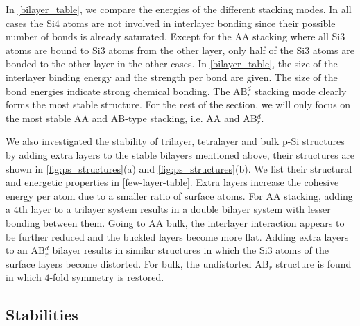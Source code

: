 In \autoref{bilayer_table}, we compare the energies of the different stacking modes. In all cases the Si4 atoms are not involved in interlayer bonding since their possible number of bonds is already saturated.  Except for the AA stacking where all Si3 atoms are bound to Si3 atoms from the other layer, only half of the Si3 atoms are bonded to the other layer in the other cases. In \autoref{bilayer_table}, the size of the interlayer binding energy and the strength per bond are given. The size of the bond energies indicate strong chemical bonding. The  AB$_r^d$ stacking mode clearly forms the most stable structure. For the rest of the section, we will only focus on the most stable AA and AB-type stacking, i.e. AA and AB$_r^d$.

We also investigated the stability of trilayer, tetralayer and bulk p-Si structures by adding extra layers to the stable bilayers mentioned above, their structures are shown in \autoref{fig:ps_structures}(a) and \autoref{fig:ps_structures}(b). We list their structural and energetic properties in \autoref{few-layer-table}. Extra layers increase the cohesive energy per atom due to a smaller ratio of surface atoms. For AA stacking, adding a 4th layer to a trilayer system results in a double bilayer system with lesser bonding between them. Going to AA bulk, the interlayer interaction appears to be further reduced and the buckled layers become more flat. Adding extra layers to an AB$_r^d$ bilayer results in similar structures in which the Si3 atoms of the surface layers become distorted. For bulk, the undistorted AB$_r$ structure is found in which $\overline{4}$-fold symmetry is restored.



\subsection{Stabilities}\label{stab}

